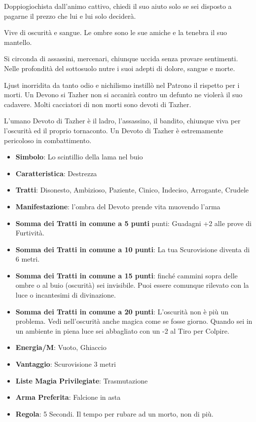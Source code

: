 \begin{multicols}{2}
Doppiogiochista dall'animo cattivo, chiedi il suo aiuto solo se sei disposto a pagarne il prezzo che lui e lui solo deciderà.

Vive di oscurità e sangue. Le ombre sono le sue amiche e la tenebra il suo mantello. 

Si circonda di assassini, mercenari, chiunque uccida senza provare sentimenti. Nelle profondità del sottosuolo nutre i suoi adepti di dolore, sangue e morte.

Ljust inorridita da tanto odio e nichilismo instillò nel Patrono il rispetto per i morti. Un Devono si Tazher non si accanirà contro un defunto ne violerà il suo cadavere. Molti cacciatori di non morti sono devoti di Tazher.

L'umano Devoto di Tazher è il ladro, l'assassino, il bandito, chiunque viva per l'oscurità ed il proprio tornaconto. Un Devoto di Tazher è estremamente pericoloso in combattimento.

\begin{itemize}[leftmargin=*] \setlength{\itemsep}{0pt}
\item \textbf{Simbolo}: Lo scintillio della lama nel buio
\item \textbf{Caratteristica}: Destrezza
\item \textbf{Tratti}: Disonesto, Ambizioso, Paziente, Cinico, Indeciso, Arrogante, Crudele
\item \textbf{Manifestazione}: l'ombra del Devoto prende vita muovendo l'arma
\item \textbf{Somma dei Tratti in comune a 5 punti} punti: Guadagni +2 alle prove di Furtività.
\item \textbf{Somma dei Tratti in comune a 10 punti}: La tua Scurovisione diventa di 6 metri.
\item \textbf{Somma dei Tratti in comune a 15 punti}: finché cammini sopra delle ombre o al buio (oscurità) sei invisibile. Puoi essere comunque rilevato con la luce o incantesimi di divinazione.
\item \textbf{Somma dei Tratti in comune a 20 punti}: L'oscurità non è più un problema. Vedi nell'oscurità anche magica come se fosse giorno. Quando sei in un ambiente in piena luce sei abbagliato con un -2 al Tiro per Colpire.
\item \textbf{Energia/M}: Vuoto, Ghiaccio
\item \textbf{Vantaggio}: Scurovisione 3 metri
\item \textbf{Liste Magia Privilegiate}: Trasmutazione
\item \textbf{Arma Preferita}: Falcione in asta
\item \textbf{Regola}: 5 Secondi. Il tempo per rubare ad un morto, non di più.
\end{itemize}


\end{multicols}

